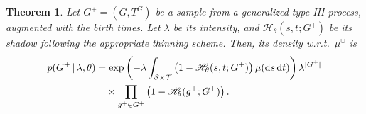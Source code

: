 \documentclass{statsoc}
\newtheorem{thrm}[defn]{Theorem}
\begin{document}
\begin{thrm}
Let $G^+ = (G, T^G)$ be a sample from a generalized \matern type-III process, augmented with the birth 
times. Let $\lambda$ be its intensity, and $\mathscr{H}_{\theta}(s,t;G^+)$ be its shadow following the appropriate thinning scheme. %
Then, its density w.r.t.\  ${\mu}^{\cup}$ is 
\begin{align}
  p(G^+ \,|\, \lambda, \theta) &=\exp\left(-\lambda \int_{{\mathcal S} \times {\mathcal T}}\left( 1 - \mathscr{H}_{\theta}(s,t;G^+)\right)\mu(\mathrm{d} s \,\mathrm{d} t)\right)
              \lambda^{|G^+|}  \nonumber \\
              & \quad \times  \prod_{g^+ \in G^+} \left( 1 - \mathscr{H}_{\theta}(g^+;G^+) \right).
\label{eq:mat_marg_prob_app}
\end{align}

\end{thrm}
\end{document}
